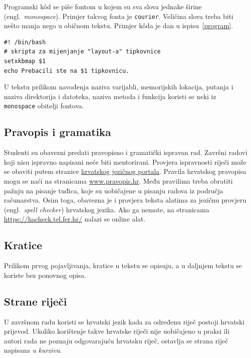 Programski k\^od se piše fontom u kojem su sva slova jednake širine (engl.~\textit{monospace}). Primjer takvog fonta je \texttt{courier}. %
Veličina slova treba biti nešto manja nego u običnom tekstu. Primjer k\^oda je dan u ispisu~\ref{program}.
%

\begin{lstlisting}[caption={Skripta za mijenjanje rasporeda tipki tipkovnice}, label=program]
#! /bin/bash
# skripta za mijenjanje "layout-a" tipkovnice
setxkbmap $1
echo Prebacili ste na $1 tipkovnicu.
\end{lstlisting}

U tekstu prilikom navođenja naziva varijabli, memorijskih lokacija, putanja i naziva direktorija i datoteka, naziva metoda i funkcija koristi se neki iz \texttt{monospace} obitelji fontova.
\subsection{Pravopis i gramatika}

Studenti su obavezni predati pravopisno i gramatički ispravan rad. Završni radovi koji nisu ispravno napisani neće biti mentorirani. Provjera ispravnosti riječi može se obaviti putem stranice \href{http://hjp.znanje.hr/}{hrvatskog jezičnog portala}. Pravila hrvatskog pravopisa mogu se naći na stranicama \href{www.pravopis.hr}{www.pravopis.hr}. Među pravilima treba obratiti pažnju na pisanje tuđica, koje su uobičajene u pisanju radova iz područja računarstva. Osim toga, obavezna je i provjera teksta alatima za jezičnu provjeru (engl.~\textit{spell checker}) hrvatskog jezika. Ako ga nemate, na stranicama \url{https://hacheck.tel.fer.hr/} nalazi se online alat.
\subsection{Kratice}

Prilikom prvog pojavljivanja, kratice u tekstu se opisuju, a u daljnjem tekstu se koriste bez ponovnog opisa. 

\subsection{Strane riječi}
U završnom radu koristi se hrvatski jezik kada za određenu riječ postoji hrvatski prijevod. Ukoliko korištenje takve hrvatske riječi nije 
uobičajeno u praksi ili autori rada ne 
poznaju odgovarajuću hrvatsku riječ, ostavlja se strana riječ napisana \textit{u kurzivu}.

